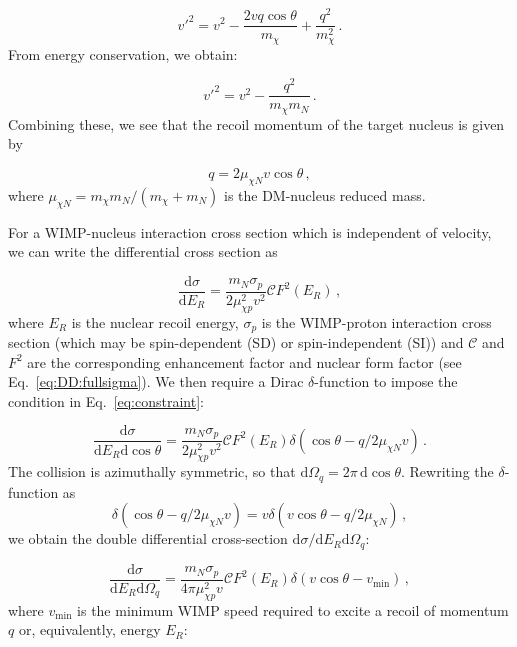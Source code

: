 \begin{equation}
v'^2 = v^2 - \frac{2 v q \cos \theta}{m_\chi} + \frac{q^2}{m_\chi^2}\,.
\end{equation}
From energy conservation, we obtain:

\begin{equation}
\label{eq:Energy}
v'^2 = v^2 - \frac{q^2}{m_\chi m_N} \,.
\end{equation}
Combining these, we see that the recoil momentum of the target nucleus is given by

\begin{equation}
\label{eq:constraint}
q = 2\mu_{\chi N} v \cos \theta \,,
\end{equation}
where \(\mu_{\chi N} = m_\chi m_N/(m_\chi + m_N)\) is the DM-nucleus reduced mass.


For a WIMP-nucleus interaction cross section which is independent of velocity, we can write the differential cross section as 

\begin{equation}
\frac{\textrm{d}\sigma}{\textrm{d}E_R} = \frac{m_N \sigma_p}{2 \mu_{\chi p}^2 v^2} \mathcal{C} F^2(E_R)\,,
\end{equation}
where \(E_R\) is the nuclear recoil energy, \(\sigma_p\) is the WIMP-proton interaction cross section (which may be spin-dependent (SD) or spin-independent (SI)) and $\mathcal{C}$ and $F^2$ are the corresponding enhancement factor and nuclear form factor (see Eq.~\ref{eq:DD:fullsigma}). We then require a Dirac \(\delta\)-function to impose the condition in Eq.\ \ref{eq:constraint}:

\begin{equation}
\frac{\textrm{d}\sigma}{\textrm{d}E_R\textrm{d}\cos\theta} = \frac{m_N \sigma_p}{2 \mu_{\chi p}^2 v^2} \mathcal{C} F^2(E_R) \delta\left(\cos\theta - q/2\mu_{\chi N}v\right)\,.
\end{equation}
The collision is azimuthally symmetric, so that \(\textrm{d}\Omega_q = 2\pi\,\textrm{d}\cos\theta\). Rewriting the $\delta$-function as 
\begin{equation}
 \delta\left(\cos\theta - q/2\mu_{\chi N}v\right) = v \delta\left(v \cos\theta - q/2\mu_{\chi N}\right)\,,
\end{equation}
we obtain the double differential cross-section \(\textrm{d}\sigma/\textrm{d}E_R \textrm{d}\Omega_q\):

\begin{equation}
\frac{\textrm{d}\sigma}{\textrm{d}E_R \textrm{d}\Omega_q} = \frac{m_N \sigma_p}{4\pi\mu_{\chi p}^2v} \mathcal{C} F^2(E_R) \delta\left(v \cos\theta - v_\textrm{min}\right)\,,
\end{equation}
where \(v_\textrm{min}\) is the minimum WIMP speed required to excite a recoil of momentum \(q\) or, equivalently, energy \(E_R\):


